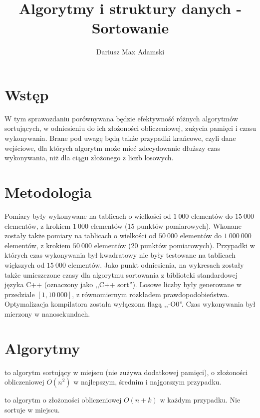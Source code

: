 \documentclass[11pt,twocolumn]{article}
\title{Algorytmy i struktury danych - Sortowanie}
\author{Dariusz Max Adamski}
\date{}
\begin{document}
\maketitle



\section*{Wstęp}

W tym sprawozdaniu porównywana będzie efektywność różnych algorytmów sortujących, w odniesieniu do ich złożoności obliczeniowej, zużycia pamięci i czasu wykonywania. Brane pod uwagę będą także przypadki krańcowe, czyli dane wejściowe, dla których algorytm może mieć zdecydowanie dłuższy czas wykonywania, niż dla ciągu złożonego z liczb losowych.



\section*{Metodologia}

Pomiary były wykonywane na tablicach o wielkości od $1\ 000$ elementów do $15\ 000$ elementów, z krokiem $1\ 000$ elementów (15 punktów pomiarowych). Wkonane zostały także pomiary na tablicach o wielkości od $50\ 000$ elementów do $1\ 000\ 000$ elementów, z krokiem $50\ 000$ elementów (20 punktów pomiarowych). Przypadki w których czas wykonywania był kwadratowy nie były testowane na tablicach większych od $15\ 000$ elementów. Jako punkt odniesienia, na wykresach zostały także umieszczone czasy dla algorytmu sortowania z biblioteki standardowej języka C++ (oznaczony jako ,,C++ sort''). Losowe liczby były generowane w przedziale $[1,10\ 000]$, z równomiernym rozkładem prawdopodobieństwa. Optymalizacja kompilatora została wyłączona flagą ,,-O0''. Czas wykonywania był mierzony w nanosekundach.



\section{Algorytmy}

 to algorytm sortujący w miejscu (nie zużywa dodatkowej pamięci), o złożoności obliczeniowej $O(n^2)$ w najlepszym, średnim i najgorszym przypadku.

 to algorytm o złożoności obliczeniowej $O(n+k)$ w każdym przypadku. Nie sortuje w miejscu.
\end{document}

